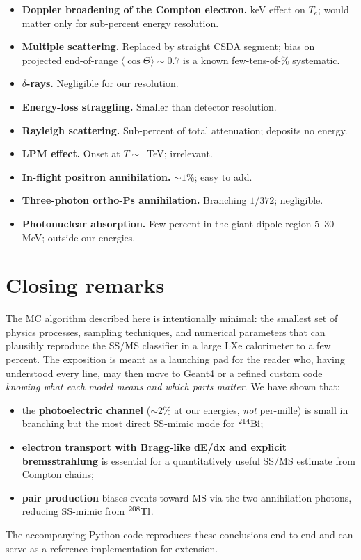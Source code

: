 \documentclass[11pt,a4paper]{article}
\begin{document}
\begin{itemize}\itemsep=0pt
  \item \textbf{Doppler broadening of the Compton electron.} 
        keV effect on $T_e$; would matter only for sub-percent
        energy resolution.
  \item \textbf{Multiple scattering.} Replaced by straight CSDA
        segment; bias on projected end-of-range
        $\langle\cos\Theta\rangle\!\sim\!0.7$ is a known
        few-tens-of-\% systematic.
  \item \textbf{$\delta$-rays.} Negligible for our resolution.
  \item \textbf{Energy-loss straggling.} Smaller than detector
        resolution.
  \item \textbf{Rayleigh scattering.} Sub-percent of total
        attenuation; deposits no energy.
  \item \textbf{LPM effect.} Onset at $T\sim$~TeV; irrelevant.
  \item \textbf{In-flight positron annihilation.} $\sim\!1\%$;
        easy to add.
  \item \textbf{Three-photon ortho-Ps annihilation.} Branching
        $1/372$; negligible.
  \item \textbf{Photonuclear absorption.} Few percent in the
        giant-dipole region 5--30 MeV; outside our energies.
\end{itemize}

\section{Closing remarks}

The MC algorithm described here is intentionally minimal: the
smallest set of physics processes, sampling techniques, and
numerical parameters that can plausibly reproduce the SS/MS
classifier in a large LXe calorimeter to a few percent. The
exposition is meant as a launching pad for the reader who, having
understood every line, may then move to {\sc Geant4} or a refined
custom code \emph{knowing what each model means and which parts
matter}. We have shown that:
\begin{itemize}\itemsep=0pt
  \item the \textbf{photoelectric channel} ($\sim 2\%$ at our
        energies, \emph{not} per-mille) is small in branching
        but the most direct SS-mimic mode for $\rm{}^{214}Bi$;
  \item \textbf{electron transport with Bragg-like dE/dx and
        explicit bremsstrahlung} is essential for a quantitatively
        useful SS/MS estimate from Compton chains;
  \item \textbf{pair production} biases events toward MS via the
        two annihilation photons, reducing SS-mimic from $\rm{}^{208}Tl$.
\end{itemize}
The accompanying Python code reproduces these conclusions
end-to-end and can serve as a reference implementation for
extension.
\end{document}
